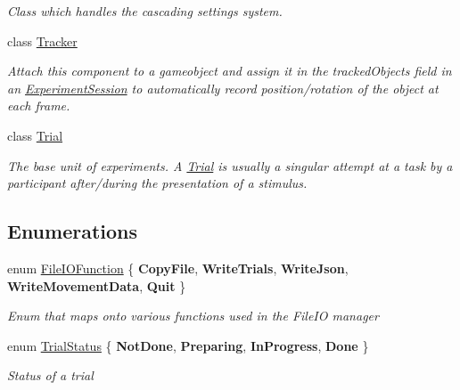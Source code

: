 \begin{DoxyCompactItemize}
\begin{DoxyCompactList}\small\item\em Class which handles the cascading settings system. \end{DoxyCompactList}\item 
class \hyperlink{class_exp_mngr_1_1_tracker}{Tracker}
\begin{DoxyCompactList}\small\item\em Attach this component to a gameobject and assign it in the tracked\+Objects field in an \hyperlink{class_exp_mngr_1_1_experiment_session}{Experiment\+Session} to automatically record position/rotation of the object at each frame. \end{DoxyCompactList}\item 
class \hyperlink{class_exp_mngr_1_1_trial}{Trial}
\begin{DoxyCompactList}\small\item\em The base unit of experiments. A \hyperlink{class_exp_mngr_1_1_trial}{Trial} is usually a singular attempt at a task by a participant after/during the presentation of a stimulus. \end{DoxyCompactList}\end{DoxyCompactItemize}
\subsection*{Enumerations}
\begin{DoxyCompactItemize}
\item 
enum \hyperlink{namespace_exp_mngr_ada658a3bceadc7d2f4be3a749edae819}{File\+I\+O\+Function} \{ \newline
{\bfseries Copy\+File}, 
{\bfseries Write\+Trials}, 
{\bfseries Write\+Json}, 
{\bfseries Write\+Movement\+Data}, 
\newline
{\bfseries Quit}
 \}\begin{DoxyCompactList}\small\item\em Enum that maps onto various functions used in the File\+IO manager \end{DoxyCompactList}
\item 
enum \hyperlink{namespace_exp_mngr_a8a72f39778ead3dc04af13a60949175c}{Trial\+Status} \{ {\bfseries Not\+Done}, 
{\bfseries Preparing}, 
{\bfseries In\+Progress}, 
{\bfseries Done}
 \}\begin{DoxyCompactList}\small\item\em Status of a trial \end{DoxyCompactList}
\end{DoxyCompactItemize}



